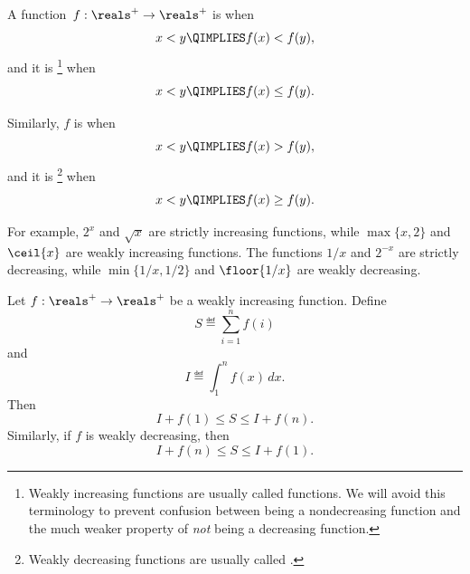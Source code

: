 \begin{definition}\label{weakly_increasing_function_def}
A function~$f: \reals^+ \to \reals^+$
is  when
\[
x < y \QIMPLIES f(x) < f(y),
\]
and it is \footnote{Weakly increasing
  functions are usually called  functions.  We
  will avoid this terminology to prevent confusion between being a
  nondecreasing function and the much weaker property
  of \emph{not} being a decreasing function.} when
\[
x < y \QIMPLIES f(x) \le f(y).
\]

Similarly, $f$ is  when
\[
x < y \QIMPLIES f(x) > f(y),
\]
and it is \footnote{Weakly decreasing
  functions are usually called .}  when
\[
x < y \QIMPLIES f(x) \ge f(y).
\]
\end{definition}

For example, $2^x$ and $\sqrt{x}$ are strictly increasing functions,
while $\max\{x,2\}$ and $\ceil{x}$ are weakly increasing functions.  The
functions $1/x$ and $2^{-x}$ are strictly decreasing, while $\min\{1/x,
  1/2\}$ and $\floor{1/x}$ are weakly decreasing.

\begin{theorem}\label{weak_increasing_sum_bounds}  %
Let $f: \reals^+ \to \reals^+$ be a weakly increasing function.
Define
\begin{equation}\label{Sdefsumf}
    S \eqdef \sum_{i = 1}^n f(i)
\end{equation}
and
\[
    I \eqdef \int_1^n f(x)\, dx.
\]
Then
\begin{equation}\label{If1lS}
    I + f(1) \le S \le I + f(n).
\end{equation}
Similarly, if $f$ is weakly decreasing, then
\[
    I + f(n) \le S \le I + f(1).
\]
\end{theorem}

